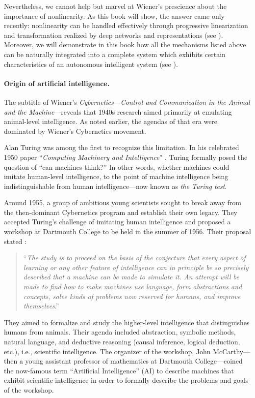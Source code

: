 \documentclass[../../book-main.tex]{subfiles}
\begin{document}
Nevertheless, we cannot help but marvel at Wiener's prescience about
the importance of nonlinearity. As this book will show, the answer
came only recently: nonlinearity can be handled effectively through
progressive linearization and transformation realized by deep
networks and representations (see ).
Moreover, we will demonstrate in this book how all the mechanisms
listed above can be naturally integrated into a complete system which
exhibits certain characteristics of an autonomous intelligent system
(see ).

\paragraph{Origin of artificial intelligence.}
The subtitle of Wiener's \textit{Cybernetics}---\textit{Control and
Communication in the Animal and the Machine}---reveals that 1940s
research aimed primarily at emulating animal-level intelligence. As
noted earlier, the agendas of that era were dominated by Wiener's
Cybernetics movement.

Alan Turing was among the first to recognize this limitation. In his
celebrated 1950 paper ``\textit{Computing Machinery and
Intelligence}'' \cite{Turing-1950}, Turing formally posed the
question of ``can machines think?'' In other words,
 whether machines could imitate human-level intelligence,
to the point of machine intelligence being indistinguishable from
human intelligence---now known as \textit{the Turing test}.

Around 1955, a group of ambitious young scientists sought to break
away from the then-dominant Cybernetics program and establish their
own legacy. They accepted Turing's challenge of imitating human
intelligence and proposed a workshop at Dartmouth College to be held
in the summer of 1956. Their proposal stated \cite{McCarthy-1955}:
\begin{quote}
    ``\textit{The study is to proceed on the basis of the conjecture
        that every aspect of learning or any other feature of
        intelligence can in principle be so precisely described that a
        machine can be made to simulate it. An attempt will be made to
        find how to make machines use language, form abstractions and
        concepts, solve kinds of problems now reserved for humans, and
    improve themselves}.''
\end{quote}
They aimed to formalize and study the higher-level intelligence that
distinguishes humans from animals. Their agenda included abstraction,
symbolic methods, natural language, and deductive reasoning (causal
inference, logical deduction, etc.), i.e., scientific intelligence.
The organizer of the workshop, John McCarthy---then a young assistant
professor of mathematics at Dartmouth College---coined the now-famous
term ``Artificial Intelligence'' (AI) to describe machines that
exhibit scientific intelligence in order to formally describe the
problems and goals of the workshop.
\end{document}
